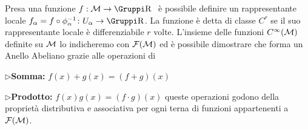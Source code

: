 Presa una funzione $f:{\MM}\to \RN{\ }$ \`e possibile definire un rappresentante locale $f_\alpha=f\circ\phi_\alpha^{-1}\colon U_\alpha\to\RN{}$. La funzione \`e detta di classe $C^r$ se il suo rappresentante locale \`e differenziabile $r$ volte. L'insieme delle funzioni $C^\infty({\cal M})$ definite su ${\cal M}$ lo indicheremo con  ${\cal F}({\cal M})$ ed \`e possibile dimostrare che forma un Anello Abeliano grazie alle operazioni di\bigskip
\item{$\triangleright$}{\bf Somma:} $f(x)+g(x)=(f+g)(x)$
\item{$\triangleright$}{\bf Prodotto:} $f(x)g(x)=(f\cdot g)(x)$
\bigskip\noindent 
queste operazioni godono della propriet\`a distributiva e associativa per ogni terna di funzioni appartenenti a ${\cal F}({\cal M})$.

